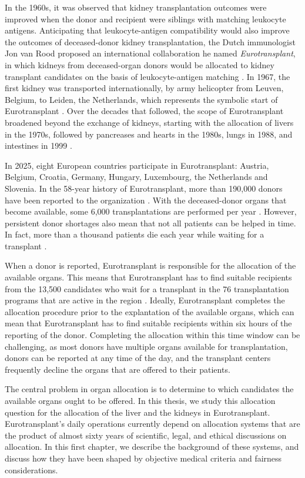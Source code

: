 \documentclass[11pt,twoside,]{book}
\begin{document}
In the 1960s, it was observed that kidney transplantation outcomes were
improved when the donor and recipient were siblings with matching leukocyte antigens.
Anticipating that leukocyte-antigen compatibility would also improve the outcomes
of deceased-donor kidney transplantation, the Dutch immunologist Jon van Rood
proposed an international collaboration he named \emph{Eurotransplant}, in which kidneys
from deceased-organ donors would be allocated to kidney transplant candidates on the basis of
leukocyte-antigen matching \citep{vanRoodET1967}. In 1967, the first kidney was
transported internationally, by army helicopter from Leuven, Belgium, to Leiden,
the Netherlands, which represents the symbolic start of Eurotransplant \citep{jubileumboek}.
Over the decades that followed, the scope of Eurotransplant broadened beyond the
exchange of kidneys, starting with the allocation of livers in the 1970s,
followed by pancreases and hearts in the 1980s, lungs in 1988,
and intestines in 1999 \citep{Langer2012}.

In 2025, eight European countries participate in Eurotransplant: Austria, Belgium,
Croatia, Germany, Hungary, Luxembourg, the Netherlands and Slovenia. In
the 58-year history of Eurotransplant, more than 190,000 donors have been reported
to the organization \citep{etStatsLibrary3002P}. With the deceased-donor organs that
become available, some 6,000 transplantations are performed per year \citep{etStatsLibrary2082P}. However,
persistent donor shortages also mean that not all patients can be helped in time.
In fact, more than a thousand patients die each year while waiting for a
transplant \citep{etStatsLibrary4512P}.

When a donor is reported, Eurotransplant is responsible for
the allocation of the available organs. This means that Eurotransplant has to find
suitable recipients from the 13,500 candidates who wait for a transplant
in the 76 transplantation programs that are active in the region \citep{etStatsLibrary3002P}. Ideally, Eurotransplant
completes the allocation procedure prior to the explantation of the available organs, which can mean that Eurotransplant has to
find suitable recipients within six hours of the reporting of the donor. Completing the allocation
within this time window can be challenging, as most donors have multiple
organs available for transplantation, donors can be reported at any time of the day,
and the transplant centers frequently decline the organs that are offered to
their patients.

The central problem in organ allocation is to determine to which candidates the
available organs ought to be offered. In this thesis, we study this allocation
question for the allocation of the liver and the kidneys in Eurotransplant.
Eurotransplant's daily operations currently depend on allocation systems that
are the product of almost sixty years of scientific, legal, and ethical discussions
on allocation. In this first chapter, we describe the background of these systems,
and discuss how they have been shaped by objective medical criteria and fairness
considerations.
\end{document}
